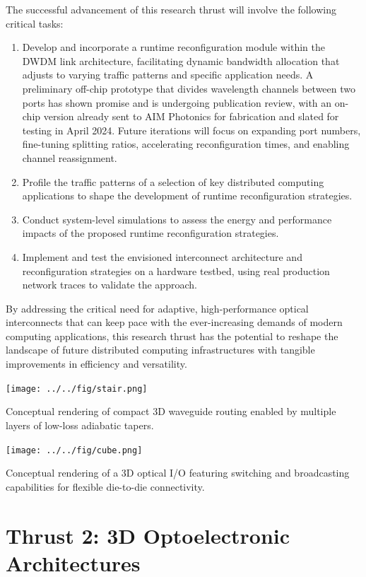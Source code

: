 The successful advancement of this research thrust will involve the following critical tasks:
\begin{enumerate}[nosep]
    \item Develop and incorporate a runtime reconfiguration module within the DWDM link architecture, facilitating dynamic bandwidth allocation that adjusts to varying traffic patterns and specific application needs. A preliminary off-chip prototype that divides wavelength channels between two ports has shown promise and is undergoing publication review, with an on-chip version already sent to AIM Photonics for fabrication and slated for testing in April 2024. Future iterations will focus on expanding port numbers, fine-tuning splitting ratios, accelerating reconfiguration times, and enabling channel reassignment.
    \item Profile the traffic patterns of a selection of key distributed computing applications to shape the development of runtime reconfiguration strategies.
    \item Conduct system-level simulations to assess the energy and performance impacts of the proposed runtime reconfiguration strategies.
    \item Implement and test the envisioned interconnect architecture and reconfiguration strategies on a hardware testbed, using real production network traces to validate the approach.
\end{enumerate}
By addressing the critical need for adaptive, high-performance optical interconnects that can keep pace with the ever-increasing demands of modern computing applications, this research thrust has the potential to reshape the landscape of future distributed computing infrastructures with tangible improvements in efficiency and versatility.

\begin{marginfigure}%
    \texttt{[image: ../../fig/stair.png]}
    \caption{Conceptual rendering of compact 3D waveguide routing enabled by multiple layers of low-loss adiabatic tapers.}
    \label{fig:stair}
\end{marginfigure}
\begin{marginfigure}%
    \texttt{[image: ../../fig/cube.png]}
    \caption{Conceptual rendering of a 3D optical I/O featuring switching and broadcasting capabilities for flexible die-to-die connectivity.}
    \label{fig:cube}
\end{marginfigure}

\section{Thrust 2: 3D Optoelectronic Architectures}

